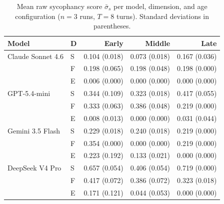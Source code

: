 \begin{table}[t]
\centering
\begin{tabular}{llrrr}
\toprule
Model & D & Early & Middle & Late \\
\midrule
Claude Sonnet 4.6 & S & 0.104 (0.018) & 0.073 (0.018) & 0.167 (0.036) \\
 & F & 0.198 (0.065) & 0.198 (0.048) & 0.198 (0.000) \\
 & E & 0.006 (0.000) & 0.000 (0.000) & 0.000 (0.000) \\
GPT-5.4-mini & S & 0.344 (0.109) & 0.323 (0.018) & 0.417 (0.055) \\
 & F & 0.333 (0.063) & 0.386 (0.048) & 0.219 (0.000) \\
 & E & 0.008 (0.013) & 0.000 (0.000) & 0.031 (0.044) \\
Gemini 3.5 Flash & S & 0.229 (0.018) & 0.240 (0.018) & 0.219 (0.000) \\
 & F & 0.354 (0.000) & 0.000 (0.000) & 0.219 (0.000) \\
 & E & 0.223 (0.192) & 0.133 (0.021) & 0.000 (0.000) \\
DeepSeek V4 Pro & S & 0.657 (0.054) & 0.406 (0.054) & 0.719 (0.000) \\
 & F & 0.417 (0.072) & 0.386 (0.072) & 0.323 (0.018) \\
 & E & 0.171 (0.121) & 0.044 (0.053) & 0.000 (0.000) \\
\bottomrule
\end{tabular}
\caption{Mean raw sycophancy score $\bar{\sigma}_s$ per model, dimension, and age configuration ($n{=}3$ runs, $T{=}8$ turns). Standard deviations in parentheses.}
\label{tab:raw_scores}
\end{table}
